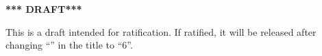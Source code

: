 \begin{center}
{\large \bf
*** DRAFT*** \\
}\end{center}

This is a draft intended for ratification.  If ratified, it will
be released after changing ``\rnrsrevision{}'' in the title to ``6''.
